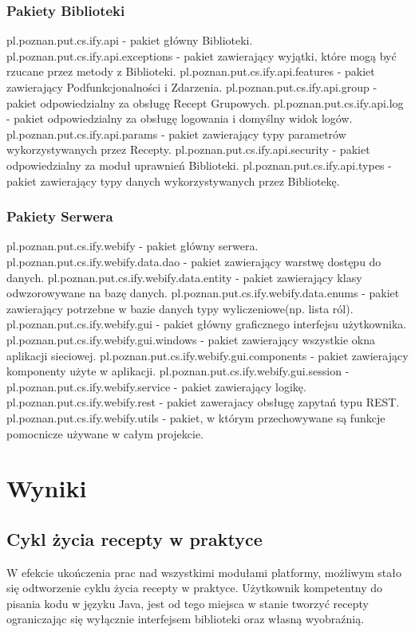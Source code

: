 \documentclass[11pt,a4paper,polish,thesis]{dcsbook}
\begin{document}
\subsection{Pakiety Biblioteki}
pl.poznan.put.cs.ify.api - pakiet główny Biblioteki.
pl.poznan.put.cs.ify.api.exceptions - pakiet zawierający wyjątki, które mogą być rzucane przez metody z Biblioteki.
pl.poznan.put.cs.ify.api.features - pakiet zawierający Podfunkcjonalności i Zdarzenia.
pl.poznan.put.cs.ify.api.group - pakiet odpowiedzialny za obsługę Recept Grupowych.
pl.poznan.put.cs.ify.api.log - pakiet odpowiedzialny za obsługę logowania i domyślny widok logów.
pl.poznan.put.cs.ify.api.params - pakiet zawierający typy parametrów wykorzystywanych przez Recepty.
pl.poznan.put.cs.ify.api.security - pakiet odpowiedzialny za moduł uprawnień Biblioteki.
pl.poznan.put.cs.ify.api.types - pakiet zawierający typy danych wykorzystywanych przez Bibliotekę.
\subsection{Pakiety Serwera}
pl.poznan.put.cs.ify.webify - pakiet główny serwera.
pl.poznan.put.cs.ify.webify.data.dao - pakiet zawierający warstwę dostępu do danych.
pl.poznan.put.cs.ify.webify.data.entity - pakiet zawierający klasy odwzorowywane na bazę danych.
pl.poznan.put.cs.ify.webify.data.enums - pakiet zawierający potrzebne w bazie danych typy wyliczeniowe(np. lista ról). 
pl.poznan.put.cs.ify.webify.gui - pakiet główny graficznego interfejsu użytkownika.
pl.poznan.put.cs.ify.webify.gui.windows - pakiet zawierający wszystkie okna aplikacji sieciowej.
pl.poznan.put.cs.ify.webify.gui.components - pakiet zawierający komponenty użyte w aplikacji.
pl.poznan.put.cs.ify.webify.gui.session - 
pl.poznan.put.cs.ify.webify.service - pakiet zawierający logikę.
pl.poznan.put.cs.ify.webify.rest - pakiet zawerajacy obsługę zapytań typu REST.
pl.poznan.put.cs.ify.webify.utils - pakiet, w którym przechowywane są funkcje pomocnicze używane w całym projekcie.

\chapter{Wyniki}
\section{Cykl życia recepty w praktyce}
W efekcie ukończenia prac nad wszystkimi modułami platformy, możliwym stało się odtworzenie cyklu życia recepty w praktyce. Użytkownik kompetentny do pisania
kodu w języku Java, jest od tego miejsca w stanie tworzyć recepty ograniczając się wyłącznie interfejsem biblioteki oraz własną wyobraźnią.
\end{document}
